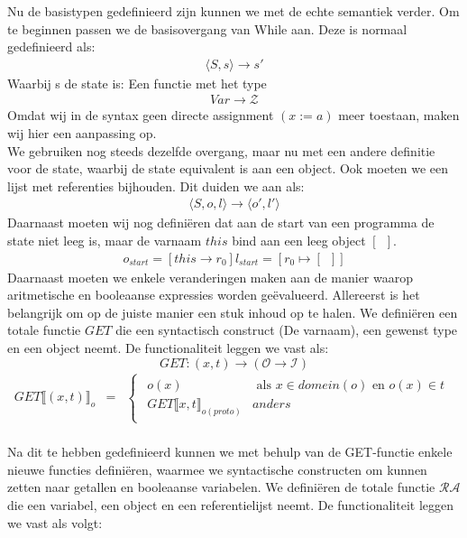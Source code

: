 \documentclass[12pt]{article}
\newcommand{\RA}{\mathcal{RA}}
\begin{document}
Nu de basistypen gedefinieerd zijn kunnen we met de echte semantiek verder. Om te beginnen passen we de basisovergang van While aan. Deze is normaal gedefinieerd als:
\begin{gather*}
 \langle S,s \rangle \rightarrow s\prime 
\end{gather*}
Waarbij s de state is: Een functie met het type
\begin{gather*}
Var \rightarrow \mathcal{Z}
\end{gather*}
Omdat wij in de syntax geen directe assignment $(x := a)$ meer toestaan, maken wij hier een aanpassing op.\\
We gebruiken nog steeds dezelfde overgang, maar nu met een andere definitie voor de state, waarbij de state equivalent is aan een object. Ook moeten we een lijst met referenties bijhouden. Dit duiden we aan als:
\begin{gather*}
 \langle S,o,l \rangle \rightarrow \langle o\prime, l\prime \rangle 
\end{gather*}
Daarnaast moeten wij nog definiëren dat aan de start van een programma de state niet leeg is, maar de varnaam $ this $ bind aan een leeg object $ [\enspace] $.
\begin{gather*}
o_{start} = [this \rightarrow r_0]	
l_{start} = [r_0 \mapsto [ \enspace ]]
\end{gather*}
Daarnaast moeten we enkele veranderingen maken aan de manier waarop aritmetische en booleaanse expressies worden geëvalueerd. 
Allereerst is het belangrijk om op de juiste manier een stuk inhoud op te halen. We definiëren een totale functie $GET$ die een syntactisch construct (De varnaam), een gewenst type en een object neemt. De functionaliteit leggen we vast als:
\[ GET: (x,t) \rightarrow (\mathcal{O} \rightarrow \mathcal{I}) \]
\[
\begin{matrix}
GET\llbracket (x,t) \rrbracket_o & = & 
\begin{cases}
\begin{matrix}
o(x) & \mbox{ als } x \in domein(o) \mbox{ en } o(x) \in t\\
GET\llbracket x,t \rrbracket_{o(proto)} & anders
\end{matrix}
\end{cases}\\
\end{matrix}
\]

Na dit te hebben gedefinieerd kunnen we met behulp van de GET-functie enkele nieuwe functies definiëren, waarmee we syntactische constructen om kunnen zetten naar getallen en booleaanse variabelen. We definiëren de totale functie $ \RA $ die een variabel, een object en een referentielijst neemt. De functionaliteit leggen we vast als volgt:
\end{document}
